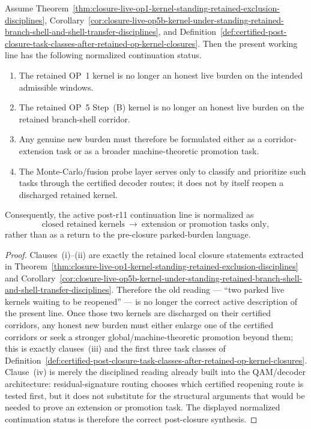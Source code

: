 \begin{proposition}
\label{prop:after-retained-kernel-closures-active-continuation-line-consists-only-of-extension-or-promotion-tasks}
Assume Theorem~\ref{thm:closure-live-op1-kernel-standing-retained-exclusion-disciplines}, Corollary~\ref{cor:closure-live-op5b-kernel-under-standing-retained-branch-shell-and-shell-transfer-disciplines}, and Definition~\ref{def:certified-post-closure-task-classes-after-retained-op-kernel-closures}. Then the present working line has the following normalized continuation status.
\begin{enumerate}[leftmargin=2em,label=(\roman*)]
  \item The retained OP~1 kernel is no longer an honest live burden on the intended admissible windows.
  \item The retained OP~5 Step~(B) kernel is no longer an honest live burden on the retained branch-shell corridor.
  \item Any genuine new burden must therefore be formulated either as a corridor-extension task or as a broader machine-theoretic promotion task.
  \item The Monte-Carlo/fusion probe layer serves only to classify and prioritize such tasks through the certified decoder routes; it does not by itself reopen a discharged retained kernel.
\end{enumerate}
Consequently, the active post-r11 continuation line is normalized as
\[
\text{closed retained kernels}
\ \to\ 
\text{extension or promotion tasks only},
\]
rather than as a return to the pre-closure parked-burden language.
\end{proposition}

\begin{proof}
Clauses~(i)--(ii) are exactly the retained local closure statements extracted in Theorem~\ref{thm:closure-live-op1-kernel-standing-retained-exclusion-disciplines} and Corollary~\ref{cor:closure-live-op5b-kernel-under-standing-retained-branch-shell-and-shell-transfer-disciplines}. Therefore the old reading --- ``two parked live kernels waiting to be reopened'' --- is no longer the correct active description of the present line. Once those two kernels are discharged on their certified corridors, any honest new burden must either enlarge one of the certified corridors or seek a stronger global/machine-theoretic promotion beyond them; this is exactly clauses~(iii) and the first three task classes of Definition~\ref{def:certified-post-closure-task-classes-after-retained-op-kernel-closures}. Clause~(iv) is merely the disciplined reading already built into the QAM/decoder architecture: residual-signature routing chooses which certified reopening route is tested first, but it does not substitute for the structural arguments that would be needed to prove an extension or promotion task. The displayed normalized continuation status is therefore the correct post-closure synthesis.
\end{proof}

